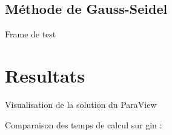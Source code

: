 \documentclass[10pt]{beamer}
\begin{document}
\subsection{Méthode de Gauss-Seidel}

	\begin{frame}	
		Frame de test
	\end{frame}	



\section{Resultats}

	\begin{frame}
		Visualisation de la solution du ParaView

	\end{frame}

	\begin{frame}
		Comparaison des temps de calcul sur gin : 

	\end{frame}
\end{document}
